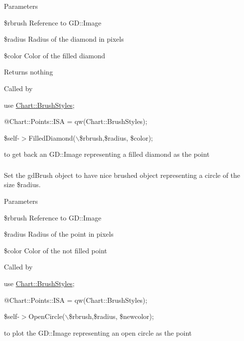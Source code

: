 \begin{DoxyParams}{Parameters}
\item[\mbox{\tt[in]} {\em $\ast$GD::Image}]\$rbrush Reference to GD::Image \item[\mbox{\tt[in]} {\em int}]\$radius Radius of the diamond in pixels \item[\mbox{\tt[in]} {\em int}]\$color Color of the filled diamond \end{DoxyParams}
\begin{DoxyReturn}{Returns}
nothing
\end{DoxyReturn}
Called by\par
 use \hyperlink{classChart_1_1BrushStyles}{Chart::BrushStyles};\par
 @Chart::Points::ISA = qw(Chart::BrushStyles);\par
 \$self-\/$>$FilledDiamond($\backslash$\$rbrush,\$radius, \$color);\par
 to get back an GD::Image representing a filled diamond as the point \hypertarget{classChart_1_1BrushStyles_adbd59ea91ba902a765fce4297a69b151}{
\subsubsection[{OpenCircle}]{}}
\label{classChart_1_1BrushStyles_adbd59ea91ba902a765fce4297a69b151}


Set the gdBrush object to have nice brushed object representing a circle of the size \$radius. 


\begin{DoxyParams}{Parameters}
\item[\mbox{\tt[in]} {\em $\ast$GD::Image}]\$rbrush Reference to GD::Image \item[\mbox{\tt[in]} {\em int}]\$radius Radius of the point in pixels \item[\mbox{\tt[in]} {\em int}]\$color Color of the not filled point\end{DoxyParams}
Called by\par
 use \hyperlink{classChart_1_1BrushStyles}{Chart::BrushStyles};\par
 @Chart::Points::ISA = qw(Chart::BrushStyles);\par
 \$self-\/$>$OpenCircle($\backslash$\$rbrush,\$radius, \$newcolor);\par
 to plot the GD::Image representing an open circle as the point \hypertarget{classChart_1_1BrushStyles_affdd85acc56b6be6068c5cc960f9857c}{
\subsubsection[{OpenDiamond}]{}}
\label{classChart_1_1BrushStyles_affdd85acc56b6be6068c5cc960f9857c}


